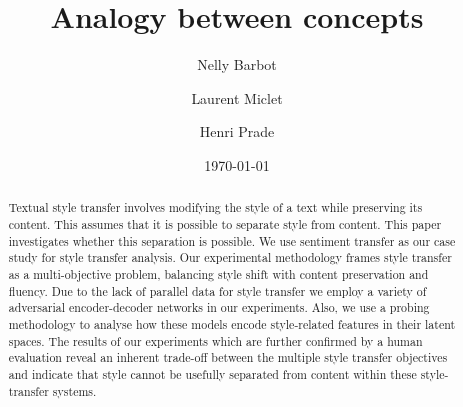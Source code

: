 \documentclass[a4paper]{article}
\title{Analogy between concepts}
\author{Nelly Barbot \and Laurent Miclet \and Henri Prade}
\date{\today}
\begin{document}
\maketitle

\begin{abstract}
  Textual style transfer involves modifying the style of a text while preserving its content. This assumes that it is possible to separate style from content. This paper investigates whether this separation is possible. We use sentiment transfer as our case study for style transfer analysis. Our experimental methodology frames style transfer as a multi-objective problem, balancing style shift with content preservation and fluency. Due to the lack of parallel data for style transfer we employ a variety of adversarial encoder-decoder networks in our experiments. Also, we use a probing methodology to analyse how these models encode style-related features in their latent spaces. The results of our experiments which are further confirmed by a human evaluation reveal an inherent trade-off between the multiple style transfer objectives and indicate that style cannot be usefully separated from content within these style-transfer systems.
\end{abstract}
\end{document}
